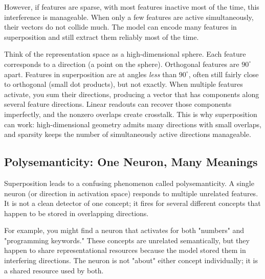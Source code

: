 \vspace{1em}

However, if features are sparse, with most features inactive most of the time, this interference is manageable. When only a few features are active simultaneously, their vectors do not collide much. The model can encode many features in superposition and still extract them reliably most of the time.

\vspace{1.5em}


\vspace{1.5em}

\begin{geometrylens}
Think of the representation space as a high-dimensional sphere. Each feature corresponds to a direction (a point on the sphere). Orthogonal features are $90^\circ$ apart. Features in superposition are at angles \emph{less} than $90^\circ$, often still fairly close to orthogonal (small dot products), but not exactly. When multiple features activate, you sum their directions, producing a vector that has components along several feature directions. Linear readouts can recover those components imperfectly, and the nonzero overlaps create crosstalk. This is why superposition can work: high-dimensional geometry admits many directions with small overlaps, and sparsity keeps the number of simultaneously active directions manageable.
\end{geometrylens}

\vspace{1.5em}

\subsection{Polysemanticity: One Neuron, Many Meanings}

Superposition leads to a confusing phenomenon called polysemanticity. A single neuron (or direction in activation space) responds to multiple unrelated features. It is not a clean detector of one concept; it fires for several different concepts that happen to be stored in overlapping directions.

For example, you might find a neuron that activates for both "numbers" and "programming keywords." These concepts are unrelated semantically, but they happen to share representational resources because the model stored them in interfering directions. The neuron is not "about" either concept individually; it is a shared resource used by both.

